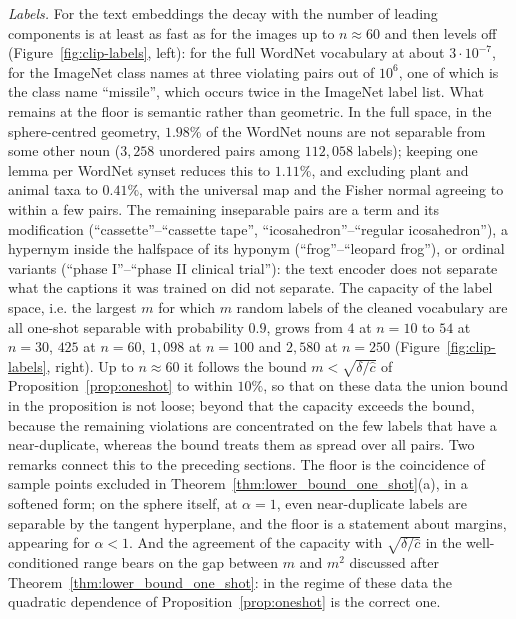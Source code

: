 {\it Labels.} For the text embeddings the decay with the number of leading components is at least as fast as for the images up to $n\approx60$ and then levels off (Figure~\ref{fig:clip-labels}, left): for the full WordNet vocabulary at about $3\cdot10^{-7}$, for the ImageNet class names at three violating pairs out of $10^6$, one of which is the class name ``missile'', which occurs twice in the ImageNet label list. What remains at the floor is semantic rather than geometric. In the full space, in the sphere-centred geometry, $1.98\%$ of the WordNet nouns are not separable from some other noun ($3{,}258$ unordered pairs among $112{,}058$ labels); keeping one lemma per WordNet synset reduces this to $1.11\%$, and excluding plant and animal taxa to $0.41\%$, with the universal map and the Fisher normal agreeing to within a few pairs. The remaining inseparable pairs are a term and its modification (``cassette''--``cassette tape'', ``icosahedron''--``regular icosahedron''), a hypernym inside the halfspace of its hyponym (``frog''--``leopard frog''), or ordinal variants (``phase I''--``phase II clinical trial''): the text encoder does not separate what the captions it was trained on did not separate. The capacity of the label space, i.e. the largest $m$ for which $m$ random labels of the cleaned vocabulary are all one-shot separable with probability $0.9$, grows from $4$ at $n=10$ to $54$ at $n=30$, $425$ at $n=60$, $1{,}098$ at $n=100$ and $2{,}580$ at $n=250$ (Figure~\ref{fig:clip-labels}, right). Up to $n\approx60$ it follows the bound $m<\sqrt{\delta/\hat c}$ of Proposition~\ref{prop:oneshot} to within $10\%$, so that on these data the union bound in the proposition is not loose; beyond that the capacity exceeds the bound, because the remaining violations are concentrated on the few labels that have a near-duplicate, whereas the bound treats them as spread over all pairs. Two remarks connect this to the preceding sections. The floor is the coincidence of sample points excluded in Theorem~\ref{thm:lower_bound_one_shot}(a), in a softened form; on the sphere itself, at $\alpha=1$, even near-duplicate labels are separable by the tangent hyperplane, and the floor is a statement about margins, appearing for $\alpha<1$. And the agreement of the capacity with $\sqrt{\delta/\hat c}$ in the well-conditioned range bears on the gap between $m$ and $m^2$ discussed after Theorem~\ref{thm:lower_bound_one_shot}: in the regime of these data the quadratic dependence of Proposition~\ref{prop:oneshot} is the correct one.
